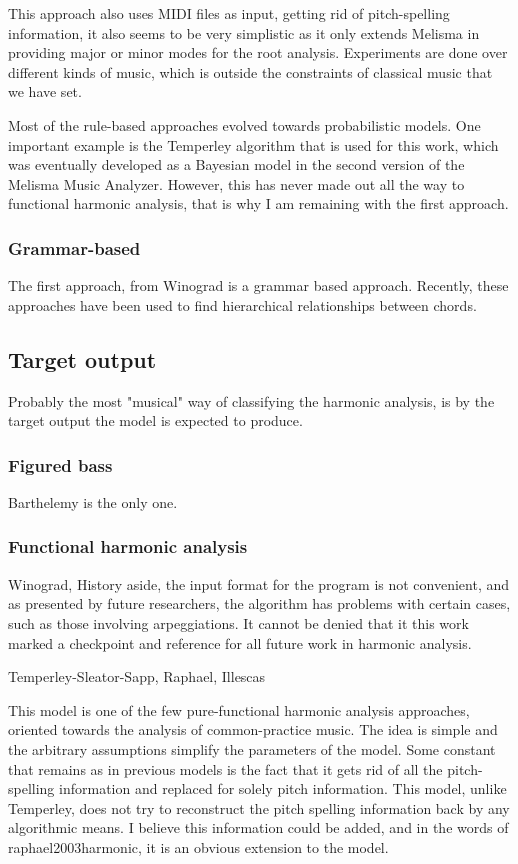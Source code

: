     This approach also uses MIDI files as input, getting rid of pitch-spelling information, it also seems to be very simplistic as it only extends Melisma in providing major or minor modes for the root analysis. Experiments are done over different kinds of music, which is outside the constraints of classical music that we have set.

    Most of the rule-based approaches evolved towards probabilistic models. One important example is the Temperley algorithm that is used for this work, which was eventually developed as a Bayesian model in the second version of the Melisma Music Analyzer. However, this has never made out all the way to functional harmonic analysis, that is why I am remaining with the first approach.
    \subsubsection{Grammar-based}
    The first approach, from Winograd is a grammar based approach. Recently, these approaches have been used to find hierarchical relationships between chords.
  \subsection{Target output}
  Probably the most "musical" way of classifying the harmonic analysis, is by the target output the model is expected to produce.
    \subsubsection{Figured bass}
    Barthelemy is the only one.
    \subsubsection{Functional harmonic analysis}
    Winograd, History aside, the input format for the program is not convenient, and as presented by future researchers, the algorithm has problems with certain cases, such as those involving arpeggiations. It cannot be denied that it this work marked a checkpoint and reference for all future work in harmonic analysis.

    Temperley-Sleator-Sapp, Raphael, Illescas

    This model is one of the few pure-functional harmonic analysis approaches, oriented towards the analysis of common-practice music. The idea is simple and the arbitrary assumptions simplify the parameters of the model. Some constant that remains as in previous models is the fact that it gets rid of all the pitch-spelling information and replaced for solely pitch information. This model, unlike Temperley, does not try to reconstruct the pitch spelling information back by any algorithmic means. I believe this information could be added, and in the words of raphael2003harmonic, it is an obvious extension to the model.

